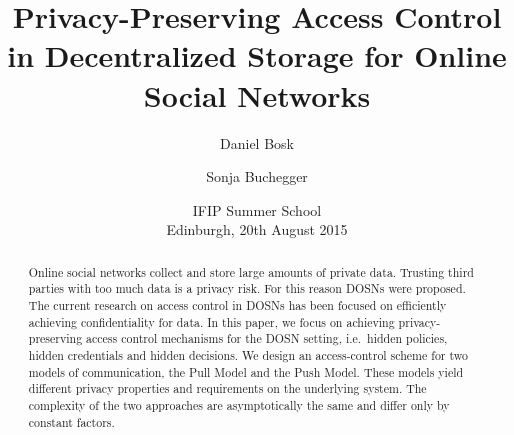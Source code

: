 \title{%
  Privacy-Preserving Access Control
  in Decentralized Storage
  for Online Social Networks
}
\author{%
  Daniel Bosk \and
  Sonja Buchegger
}
\date{IFIP Summer School\\Edinburgh, 20th August 2015}

\maketitle

\mode* %

\begin{abstract}
  Online social networks collect and store large amounts of private data.
  Trusting third parties with too much data is a privacy risk.
  For this reason \acp{DOSN} were proposed.
  The current research on access control in \acp{DOSN} has been focused on 
  efficiently achieving confidentiality for data.
  In this paper, we focus on achieving privacy-preserving access control 
  mechanisms for the \ac{DOSN} setting, i.e.~hidden policies, 
  hidden credentials and hidden decisions.
  We design an access-control scheme for two models of communication, the Pull 
  Model and the Push Model.
  These models yield different privacy properties and requirements on the 
  underlying system.
  The complexity of the two approaches are asymptotically the same and differ 
  only by constant factors.

\end{abstract}


%


